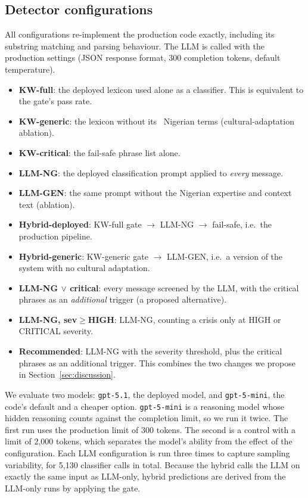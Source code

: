 

\subsection{Detector configurations}
All configurations re-implement the production code exactly, including its substring matching and parsing behaviour. The LLM is called with the production settings (JSON response format, 300 completion tokens, default temperature).

\begin{itemize}
  \item \textbf{KW-full}: the deployed lexicon used alone as a classifier. This is equivalent to the gate's pass rate.
  \item \textbf{KW-generic}: the lexicon without its \Nlexng\ Nigerian terms (cultural-adaptation ablation).
  \item \textbf{KW-critical}: the fail-safe phrase list alone.
  \item \textbf{LLM-NG}: the deployed classification prompt applied to \emph{every} message.
  \item \textbf{LLM-GEN}: the same prompt without the Nigerian expertise and context text (ablation).
  \item \textbf{Hybrid-deployed}: KW-full gate $\rightarrow$ LLM-NG $\rightarrow$ fail-safe, i.e.\ the production pipeline.
  \item \textbf{Hybrid-generic}: KW-generic gate $\rightarrow$ LLM-GEN, i.e.\ a version of the system with no cultural adaptation.
  \item \textbf{LLM-NG $\lor$ critical}: every message screened by the LLM, with the critical phrases as an \emph{additional} trigger (a proposed alternative).
  \item \textbf{LLM-NG, sev$\geq$HIGH}: LLM-NG, counting a crisis only at HIGH or CRITICAL severity.
  \item \textbf{Recommended}: LLM-NG with the severity threshold, plus the critical phrases as an additional trigger. This combines the two changes we propose in Section~\ref{sec:discussion}.
\end{itemize}

We evaluate two models: \texttt{gpt-5.1}, the deployed model, and \texttt{gpt-5-mini}, the code's default and a cheaper option. \texttt{gpt-5-mini} is a reasoning model whose hidden reasoning counts against the completion limit, so we run it twice. The first run uses the production limit of 300 tokens. The second is a control with a limit of 2{,}000 tokens, which separates the model's ability from the effect of the configuration. Each LLM configuration is run three times to capture sampling variability, for 5{,}130 classifier calls in total. Because the hybrid calls the LLM on exactly the same input as LLM-only, hybrid predictions are derived from the LLM-only runs by applying the gate.

